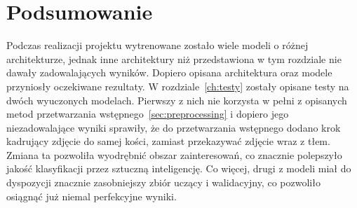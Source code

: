 \section{Podsumowanie}\label{sec:podsumowanie}

Podczas realizacji projektu wytrenowane zostało wiele modeli o różnej architekturze, jednak inne architektury niż przedstawiona w tym rozdziale nie dawały zadowalających wyników.
Dopiero opisana architektura oraz modele przyniosły oczekiwane rezultaty.
W rozdziale~\ref{ch:testy} zostały opisane testy na dwóch wyuczonych modelach.
Pierwszy z nich nie korzysta w pełni z opisanych metod przetwarzania wstępnego~\ref{sec:preprocessing} i dopiero jego niezadowalające wyniki sprawiły,
że do przetwarzania wstępnego dodano krok kadrujący zdjęcie do samej kości, zamiast przekazywać zdjęcie wraz z tłem.
Zmiana ta pozwoliła wyodrębnić obszar zainteresowań, co znacznie polepszyło jakość klasyfikacji przez sztuczną inteligencję.
Co więcej, drugi z modeli miał do dyspozycji znacznie zasobniejszy zbiór uczący i walidacyjny, co pozwoliło osiągnąć już niemal perfekcyjne wyniki.


